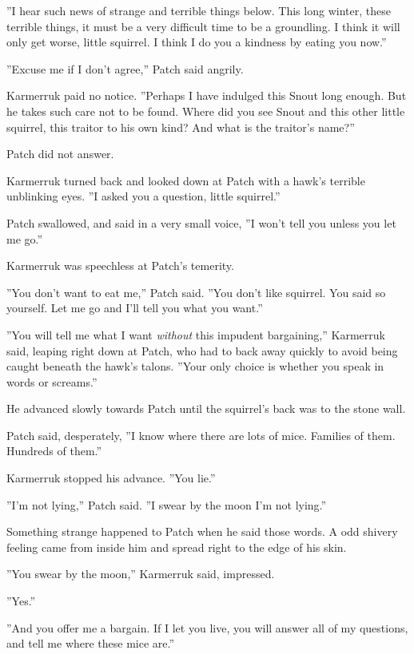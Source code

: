 \documentclass[12pt]{book}
\begin{document}
''I hear such news of strange and terrible things below. This long winter, these terrible things, it must be a very difficult time to be a groundling. I think it will only get worse, little squirrel. I think I do you a kindness by eating you now.''\par
''Excuse me if I don't agree,'' Patch said angrily.\par
Karmerruk paid no notice. ''Perhaps I have indulged this Snout long enough. But he takes such care not to be found. Where did you see Snout and this other little squirrel, this traitor to his own kind? And what is the traitor's name?''\par
Patch did not answer.\par
Karmerruk turned back and looked down at Patch with a hawk's terrible unblinking eyes. ''I asked you a question, little squirrel.''\par
Patch swallowed, and said in a very small voice, ''I won't tell you unless you let me go.''\par
Karmerruk was speechless at Patch's temerity.\par
''You don't want to eat me,'' Patch said. ''You don't like squirrel. You said so yourself. Let me go and I'll tell you what you want.''\par
''You will tell me what I want {\it without} this impudent bargaining,'' Karmerruk said, leaping right down at Patch, who had to back away quickly to avoid being caught beneath the hawk's talons. ''Your only choice is whether you speak in words or screams.''\par
He advanced slowly towards Patch until the squirrel's back was to the stone wall.\par
Patch said, desperately, ''I know where there are lots of mice. Families of them. Hundreds of them.''\par
Karmerruk stopped his advance. ''You lie.''\par
''I'm not lying,'' Patch said. ''I swear by the moon I'm not lying.''\par
Something strange happened to Patch when he said those words. A odd shivery feeling came from inside him and spread right to the edge of his skin.\par
''You swear by the moon,'' Karmerruk said, impressed.\par
''Yes.''\par
''And you offer me a bargain. If I let you live, you will answer all of my questions, and tell me where these mice are.''\par
\end{document}
